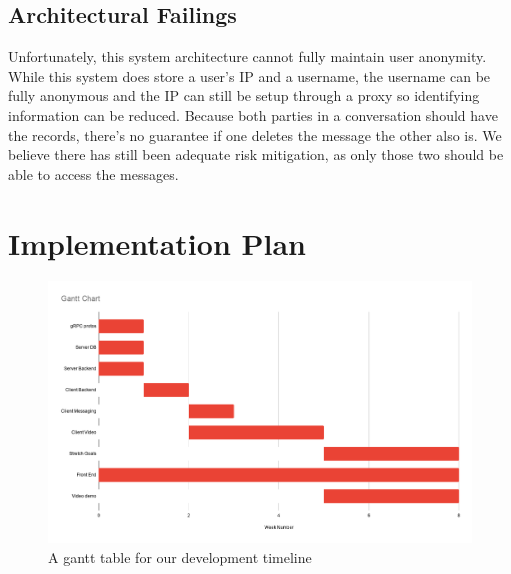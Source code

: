 \documentclass[titlepage]{article}
\begin{document}
    \subsection{Architectural Failings}

    Unfortunately, this system architecture cannot fully maintain user anonymity.
    While this system does store a user's IP and a username, the username can be fully anonymous and the IP can still be setup through a proxy so identifying information can be reduced.
    Because both parties in a conversation should have the records, there's no guarantee if one deletes the message the other also is.
    We believe there has still been adequate risk mitigation, as only those two should be able to access the messages.

    \section{Implementation Plan}
    
    \begin{center}
        \begin{figure}[!ht]
            \includegraphics[scale=.35]{graphics/GanttChart.png}
            \caption{A gantt table for our development timeline}
        \end{figure}
    \end{center}
\end{document}
